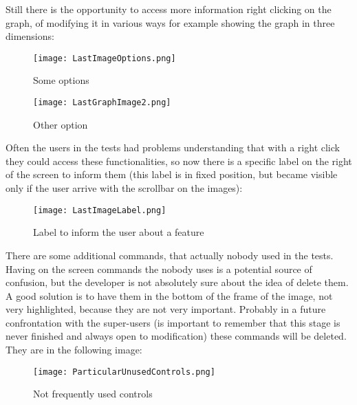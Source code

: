 \newpage

Still there is the opportunity to access more information right clicking on the graph, of modifying it in various ways for example showing the graph in three dimensions: 

\begin{figure}[H]
\centering
\texttt{[image: LastImageOptions.png]} 
\caption{Some options}
\end{figure}  

\begin{figure}[H]
\centering
\texttt{[image: LastGraphImage2.png]} 
\caption{Other option}
\end{figure}  

Often the users in the tests had problems understanding that with a right click they could access these functionalities, so now there is a specific label on the right of the screen to inform them (this label is in fixed position, but became visible only if the user arrive with the scrollbar on the images):

\begin{figure}[H]
\centering
\texttt{[image: LastImageLabel.png]} 
\caption{Label to inform the user about a feature}
\end{figure} 

There are some additional commands, that actually nobody used in the tests. Having on the screen commands the nobody uses is a potential source of confusion, but the developer is not absolutely sure about the idea of delete them. A good solution is to have them in the bottom of the frame of the image, not very highlighted, because they are not very important. Probably in a future confrontation with the super-users (is important to remember that this stage is never finished and always open to modification) these commands will be deleted.
They are in the following image:

\begin{figure}[H]
\centering
\texttt{[image: ParticularUnusedControls.png]} 
\caption{Not frequently used controls}
\end{figure}  